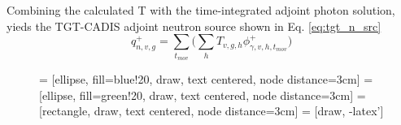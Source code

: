 Combining the calculated T with the time-integrated adjoint photon solution,
yieds the TGT-CADIS adjoint neutron source shown in Eq.
\ref{eq:tgt_n_src}
\begin{equation}\label{eq:tgt_n_src}
	q_{n,v,g}^{+} =
	\sum_{t_{mov}}\Bigg(\sum_{h} T_{v,g,h} \phi_{\gamma,v,h,t_{mov}}^{+}\Bigg)
\end{equation}



\begin{figure}\label{fig:gen_q_n_+}
\centering

         = [ellipse, fill=blue!20, draw, text centered, node distance=3cm]
         = [ellipse, fill=green!20, draw, text centered, node distance=3cm]
         = [rectangle, draw, text centered, node distance=3cm]
         = [draw, -latex']
        

\end{figure}
